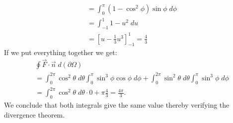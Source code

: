 \documentclass[11pt]{article}
\begin{document}
\begin{solution}
\begin{align*}
        \\&
        = \int_0^{\pi}(1 - \cos^2\phi)\sin\phi\;d\phi 
        \\&
        = \int_{-1}^1 1 - u^2 \;d u  
        \\&
        = \left[ u - \frac{1}{3}u^3\right]_{-1}^{1} = \frac{4}{3}
    \end{align*}
    If we put everything together we get:
    \begin{align*}
        &
        \oint \vec{F}\cdot \vec{n} \;d(\partial \Omega)
        \\&
        =
        \int_{0}^{2\pi}\cos^2\theta\;d\theta\int_0^{\pi}\sin^3\phi\cos\phi\;d\phi + \int_{0}^{2\pi}\sin^2\theta\;d\theta\int_0^{\pi}\sin^3\phi\;d\phi 
        \\&
        =\int_{0}^{2\pi}\cos^2\theta\;d\theta \cdot 0+ \pi\frac{4}{3} = \frac{4\pi}{3}
        .
    \end{align*}
    We conclude that both integrals give the same value thereby verifying the divergence theorem.
\end{solution}

    
\end{document}
